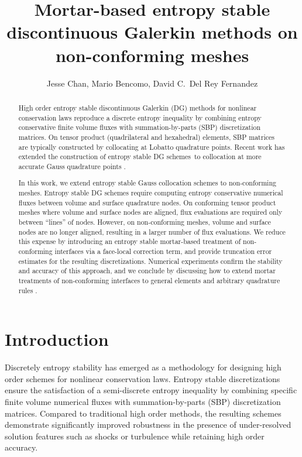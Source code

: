 \documentclass{svjour3}                     %
\date{}
\author{Jesse Chan, Mario Bencomo, David C.\ Del Rey Fernandez}
\title{Mortar-based entropy stable discontinuous Galerkin methods on non-conforming meshes}
\begin{document}
\maketitle

\begin{abstract}
High order entropy stable discontinuous Galerkin (DG) methods for nonlinear conservation laws reproduce a discrete entropy inequality by combining entropy conservative finite volume fluxes with summation-by-parts (SBP) discretization matrices.  On tensor product (quadrilateral and hexahedral) elements, SBP matrices are typically constructed by collocating at Lobatto quadrature points.  Recent work has extended the construction of entropy stable DG schemes to collocation at more accurate Gauss quadrature points \cite{chan2018efficient}.  

In this work, we extend entropy stable Gauss collocation schemes to non-conforming meshes.  Entropy stable DG schemes require computing entropy conservative numerical fluxes between volume and surface quadrature nodes.  On conforming tensor product meshes where volume and surface nodes are aligned, flux evaluations are required only between ``lines'' of nodes.  However, on non-conforming meshes, volume and surface nodes are no longer aligned, resulting in a larger number of flux evaluations.  We reduce this expense by introducing an entropy stable mortar-based treatment of non-conforming interfaces via a face-local correction term, and provide truncation error estimates for the resulting discretizations.  Numerical experiments confirm the stability and accuracy of this approach, and we conclude by discussing how to extend mortar treatments of non-conforming interfaces to general elements and arbitrary quadrature rules \cite{chan2017discretely}.  
\end{abstract}



\section{Introduction}
Discretely entropy stability has emerged as a methodology for designing high order schemes for nonlinear conservation laws.  Entropy stable discretizations ensure the satisfaction of a semi-discrete entropy inequality by combining specific finite volume numerical fluxes with summation-by-parts (SBP) discretization matrices.  Compared to traditional high order methods, the resulting schemes demonstrate significantly improved robustness in the presence of under-resolved solution features such as shocks or turbulence while retaining high order accuracy.  
\end{document}
